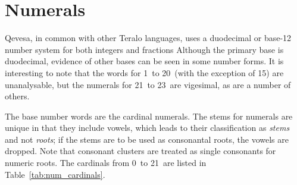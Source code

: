 \documentclass[grammar]{subfiles}
\begin{document}
	\section*{Numerals}
	\label{ch:numerals}

	Qevesa, in common with other Teralo languages, uses a duodecimal or base-12 number system for both integers and fractions Although the primary base is duodecimal, evidence of other bases can be seen in some number forms. It is interesting to note that the words for 1\dec\ to 20\dec\ (with the exception of 15\dec) are unanalysable, but the numerals for 21\dec\ to 23\dec\ are vigesimal\footnotemark{}, as are a number of others.


	The base number words are the cardinal numerals. The stems for numerals are unique in that they include vowels, which leads to their classification as \emph{stems} and not \emph{roots}; if the stems are to be used as consonantal roots, the vowels are dropped. Note that consonant clusters are treated as single consonants for numeric roots. The cardinals from 0\dec\ to 21\dec\ are listed in Table~\ref{tab:num_cardinals}.

	\begin{table}[htpb]\small\capstart
		\begin{center}
			\qquad
			\caption{Cardinal numerals from 0\dec\ to 21\dec\label{tab:num_cardinals}}
		\end{center}
	\end{table}
\end{document}
